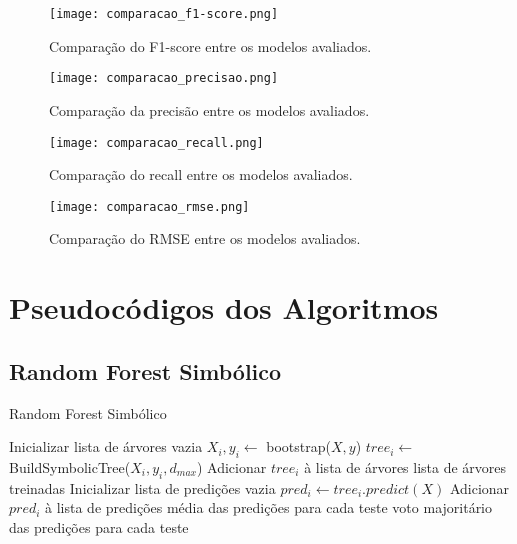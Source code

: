 \documentclass[11pt]{article}
\begin{document}
\begin{figure}[ht]
\centering
\texttt{[image: comparacao\_f1-score.png]}
\caption{Comparação do F1-score entre os modelos avaliados.}
\label{fig:comparacao_f1}
\end{figure}

\begin{figure}[ht]
\centering
\texttt{[image: comparacao\_precisao.png]}
\caption{Comparação da precisão entre os modelos avaliados.}
\label{fig:comparacao_precision}
\end{figure}

\begin{figure}[ht]
\centering
\texttt{[image: comparacao\_recall.png]}
\caption{Comparação do recall entre os modelos avaliados.}
\label{fig:comparacao_recall}
\end{figure}

\begin{figure}[ht]
\centering
\texttt{[image: comparacao\_rmse.png]}
\caption{Comparação do RMSE entre os modelos avaliados.}
\label{fig:comparacao_rmse}
\end{figure}

\section{Pseudocódigos dos Algoritmos}
\subsection{Random Forest Simbólico}
\begin{algorithm}[H]
\caption{Random Forest Simbólico}
\begin{algorithmic}[1]
    \State Inicializar lista de árvores vazia
        \State $X_i, y_i \gets$ bootstrap($X, y$)
        \State $tree_i \gets$ BuildSymbolicTree($X_i, y_i, d_{max}$)
        \State Adicionar $tree_i$ à lista de árvores
    \EndFor
    \State \Return lista de árvores treinadas
\EndProcedure
{}
    \State Inicializar lista de predições vazia
        \State $pred_i \gets tree_i.predict(X)$
        \State Adicionar $pred_i$ à lista de predições
    \EndFor
        \State \Return média das predições para cada teste
    \Else
        \State \Return voto majoritário das predições para cada teste
    \EndIf
\EndProcedure
\end{algorithmic}
\end{algorithm}
\end{document}
